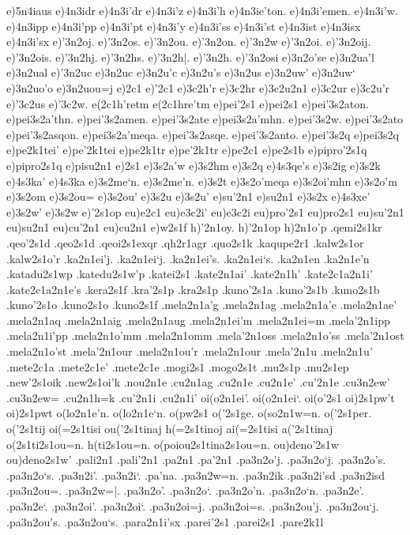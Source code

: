 {e)5n4iaus
e)4n3idr
e)4n3i'dr
e)4n3i'z
e)4n3i'h
e)4n3ie'ton.
e)4n3i'emen.
e)4n3i'w.
e)4n3ipp
e)4n3i'pp
e)4n3i'pt
e)4n3i'y
e)4n3i'ss
e)4n3i'st
e)4n3ist
e)4n3isx
e)4n3i'sx
e)'3n2oj.
e)'3n2os.
e)'3n2ou.
e)'3n2on.
e)'3n2w
e)'3n2oi.
e)'3n2oij.
e)'3n2ois.
e)'3n2hj.
e)'3n2hs.
e)'3n2h|.
e)'3n2h.
e)'3n2osi
e)3n2o'se
e)3n2ua'l
e)3n2ual
e)'3n2uc
e)3n2uc
e)3n2u'c
e)3n2u's
e)3n2us
e)3n2uw'
e)3n2uw`
e)3n2uo'o
e)3n2uou=j
e)2c1
e)'2c1
e)3c2h'r
e)3c2hr
e)3c2u2n1
e)3c2ur
e)3c2u'r
e)'3c2us
e)'3c2w.
e(2c1h'retm
e(2c1hre'tm
e)pei'2s1
e)pei2s1
e)pei'3s2aton.
e)pei3s2a'thn.
e)pei'3s2amen.
e)pei'3s2ate
e)pei3s2a'mhn.
e)pei'3s2w.
e)pei'3s2ato
e)pei'3s2asqon.
e)pei3s2a'meqa.
e)pei'3s2asqe.
e)pei'3s2anto.
e)pei'3s2q
e)pei3s2q
e)pe2k1tei'
e)pe'2k1tei
e)pe2k1tr
e)pe'2k1tr
e)pe2c1
e)pe2s1b
e)pipro'2s1q
e)pipro2s1q
e)pisu2n1
e)2s1
e)3s2a'w
e)3s2hm
e)3s2q
e)4s3qe's
e)3s2ig
e)3s2k
e)4s3ka'
e)4s3ka
%
e)3s2me`n.
e)3s2me'n.
e)3s2t
e)3s2o'meqa
e)3s2oi'mhn
e)3s2o'm
e)3s2om
e)3s2ou=
e)3s2ou'
%
e)3s2u
e)3s2u'
e)su'2n1
e)su2n1
e)3s2x
e)4s3xe'
e)3s2w'
e)3s2w
e)'2s1op
eu)e2c1
eu)e3c2i'
eu)e3c2i
eu)pro'2s1
eu)pro2s1
eu)su'2n1
eu)su2n1
eu)cu'2n1
eu)cu2n1
e)w2s1f
h)'2n1oy.
h)'2n1op
h)2n1o'p
.qemi2s1kr
.qeo'2s1d
.qeo2s1d
.qeoi2s1exqr
.qh2r1agr
.quo2s1k
.kaqupe2r1
.kalw2s1or
.kalw2s1o'r
.ka2n1ei'j.
.ka2n1ei`j.
.ka2n1ei's.
.ka2n1ei`s.
.ka2n1en
.ka2n1e'n
.katadu2s1wp
.katedu2s1w'p
.katei2s1
.kate2n1ai'
.kate2n1h'
.kate2c1a2n1i'
.kate2c1a2n1e's
.kera2s1f
.kra'2s1p
.kra2s1p
.kuno'2s1a
.kuno'2s1b
.kuno2s1b
.kuno'2s1o
.kuno2s1o
.kuno2s1f
.mela2n1a'g
.mela2n1ag
.mela2n1a'e
.mela2n1ae'
.mela2n1aq
.mela2n1aig
.mela2n1aug
.mela2n1ei'm
.mela2n1ei=m
.mela'2n1ipp
.mela2n1i'pp
.mela2n1o'mm
.mela2n1omm
.mela'2n1oss
.mela2n1o'ss
.mela'2n1ost
.mela2n1o'st
.mela'2n1our
.mela2n1ou'r
.mela2n1our
.mela'2n1u
.mela2n1u'
.mete2c1a
.mete2c1e'
.mete2c1e
.mogi2s1
.mogo2s1t
.mu2s1p
.mu2s1ep
.new'2s1oik
.new2s1oi'k
.nou2n1e
.cu2n1ag
.cu2n1e
.cu2n1e'
.cu'2n1e
.cu3n2ew'
.cu3n2ew=
.cu2n1h=k
.cu'2n1i
.cu2n1i'
oi(o2n1ei'.
oi(o2n1ei`.
oi(o'2s1
oi)2s1pw't
oi)2s1pwt
o(lo2n1e'n.
o(lo2n1e`n.
o(pw2s1
o('2s1ge.
o(so2n1w=n.
o('2s1per.
o('2s1tij
oi(=2s1tisi
ou('2s1tinaj
h(=2s1tinoj
ai(=2s1tisi
a('2s1tinaj
o(2s1ti2s1ou=n.
h(ti2s1ou=n.
o(poiou2s1tina2s1ou=n.
ou)deno'2s1w
ou)deno2s1w'
.pali2n1
.pali'2n1
.pa2n1
.pa'2n1
.pa3n2o'j.
.pa3n2o`j.
.pa3n2o's.
.pa3n2o`s.
.pa3n2i'.
.pa3n2i`.
.pa'na.
.pa3n2w=n.
.pa3n2ik
.pa3n2i'sd
.pa3n2isd
.pa3n2ou=.
.pa3n2w=|.
.pa3n2o'.
.pa3n2o`.
.pa3n2o'n.
.pa3n2o`n.
.pa3n2e'.
.pa3n2e`.
.pa3n2oi'.
.pa3n2oi`.
.pa3n2oi=j.
.pa3n2oi=s.
.pa3n2ou'j.
.pa3n2ou`j.
.pa3n2ou's.
.pa3n2ou`s.
.para2n1i'sx
.parei'2s1
.parei2s1
.pare2k1l
}
